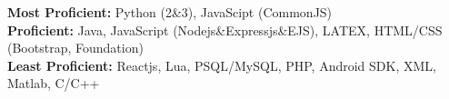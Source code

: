 

\begin{cvparagraph}

  \textbf{Most Proficient:} Python (2\&3), JavaScipt (CommonJS)\\
  \textbf{Proficient:} Java, JavaScript (Nodejs\&Expressjs\&EJS), LATEX, HTML/CSS (Bootstrap, Foundation)\\
  \textbf{Least Proficient:} Reactjs, Lua, PSQL/MySQL, PHP, Android SDK, XML, Matlab, C/C++
\end{cvparagraph}
